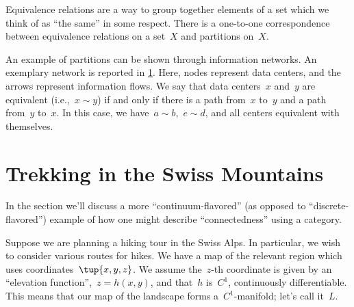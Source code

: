 \begin{remark}
    Equivalence relations are a way to group together elements of a set which we think of as ``the same'' in some respect. There is a one-to-one correspondence between equivalence relations on a set~$X$ and partitions on~$X$.
\end{remark}

\begin{example}
    An example of partitions can be shown through information networks. An exemplary network is reported in \cref{fig:info_network}. Here, nodes represent data centers, and the arrows represent information flows. We say that data centers~$x$ and~$y$ are equivalent (i.e.,~$x\sim y$) if and only if there is a path from~$x$ to~$y$ and a path from~$y$ to~$x$. In this case, we have~$a\sim b$,~$e\sim d$, and all centers equivalent with themselves.
\end{example}

\begin{figure}[h!]
    \begin{center}
    \end{center}
    \caption{\label{fig:info_network}}
\end{figure}


\section{Trekking in the Swiss Mountains }
\label{sec:trekking}



In the section we'll discuss a more ``continuum-flavored'' (as opposed to ``discrete-flavored'') example of how one might describe ``connectedness'' using a category.


Suppose we are planning a hiking tour in the Swiss Alps. In particular, we wish to consider various routes for hikes. We have a map of the relevant region which uses coordinates~$\tup{x,y,z}$. We assume the~$z$-th coordinate is given by an ``elevation function'',~$z = h(x,y)$, and that~$h$ is~$C^1$,  continuously differentiable. This means that our map of the landscape forms a~$C^1$-manifold; let's call it~$L$.


